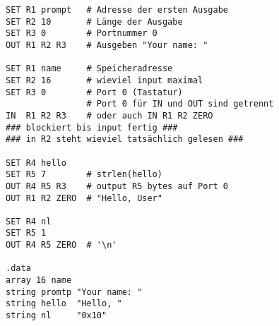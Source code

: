 \begin{lstlisting}
SET R1 prompt   # Adresse der ersten Ausgabe
SET R2 10       # Länge der Ausgabe
SET R3 0        # Portnummer 0
OUT R1 R2 R3    # Ausgeben "Your name: "

SET R1 name     # Speicheradresse
SET R2 16       # wieviel input maximal
SET R3 0        # Port 0 (Tastatur)
                # Port 0 für IN und OUT sind getrennt
IN  R1 R2 R3    # oder auch IN R1 R2 ZERO
### blockiert bis input fertig ###
### in R2 steht wieviel tatsächlich gelesen ###

SET R4 hello
SET R5 7        # strlen(hello)
OUT R4 R5 R3    # output R5 bytes auf Port 0
OUT R1 R2 ZERO  # "Hello, User"

SET R4 nl
SET R5 1
OUT R4 R5 ZERO  # '\n'

.data
array 16 name
string promtp "Your name: "
string hello  "Hello, "
string nl     "0x10"
\end{lstlisting}

